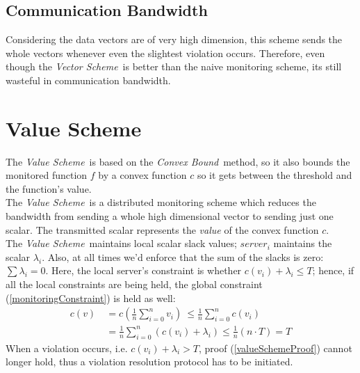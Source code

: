\documentclass[10pt, conference]{IEEEtran}
\newcommand{\vectorScheme}{\textit{Vector Scheme}}
\newcommand{\valueScheme}{\textit{Value Scheme}}
\newcommand{\convexBound}{\textit{Convex Bound}}
\begin{document}
\subsection{Communication Bandwidth}
Considering the data vectors are of very high dimension, this scheme sends the whole vectors whenever even the slightest violation occurs. Therefore, even though the \vectorScheme \  is better than the naive monitoring scheme, its still wasteful in communication bandwidth.

\section{Value Scheme}
The \valueScheme \ is based on the \convexBound \ method, so it also bounds the monitored function $f$ by a convex function $c$ so it gets between the threshold and the function's value. \\ 
The \valueScheme \ is a distributed monitoring scheme which reduces the bandwidth from sending a whole high dimensional vector to sending just one scalar. The transmitted scalar represents the \textit{value} of the convex function $c$.\\
The \valueScheme \ maintains local scalar slack values; $server_i$ maintains the scalar $\lambda _i$. Also, at all times we'd enforce that the sum of the slacks is zero: ${\sum{\lambda _i} = 0}$. Here, the local server's constraint is whether ${c(v_i) + \lambda _i \leq T}$; hence, if all the local constraints are being held, the global constraint (\ref{monitoringConstraint}) is held as well:
\begin{equation}
\label{valueSchemeProof}
\begin{aligned}
 c(v)  \
	    &=   c\left(\frac{1}{n} \sum\limits_{i=0}^{n}{v_i}\right)  \
       \leq   \frac{1}{n} \sum\limits_{i=0}^{n}c(v_i) \\
        &=    \frac{1}{n} \sum\limits_{i=0}^{n}{(c(v_i) + \lambda _i)}
       \leq   \frac{1}{n}(n \cdot T)
        = T
\end{aligned}
\end{equation}
When a violation occurs, i.e. ${c(v_i) + \lambda _i > T}$, proof (\ref{valueSchemeProof}) cannot longer hold, thus a violation resolution protocol has to be initiated.
\end{document}
